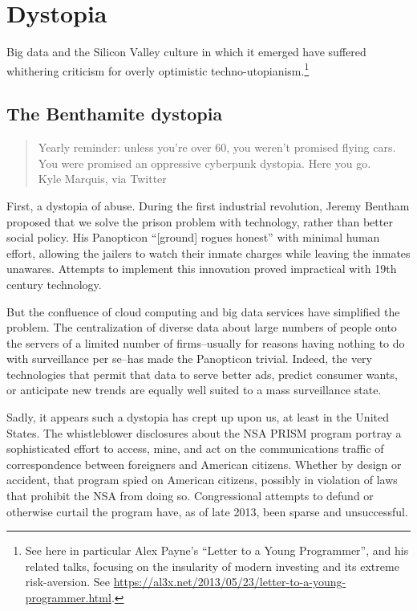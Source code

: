 \documentclass[12pt]{article}
\begin{document}
\section{Dystopia}
\label{sec:dystopic-future}

Big data and the Silicon Valley culture in which it emerged have
suffered whithering criticism for overly optimistic
techno-utopianism.\footnote{See here in particular Alex Payne's
  ``Letter to a Young Programmer'', and his related talks, focusing on
  the insularity of modern investing and its extreme
  risk-aversion. See
  \url{https://al3x.net/2013/05/23/letter-to-a-young-programmer.html}.}

\subsection{The Benthamite dystopia}
\label{sec:benthamite-dystopia}

\begin{quote}
  Yearly reminder: unless you're over 60, you weren't promised flying
  cars. You were promised an oppressive cyberpunk dystopia. Here you
  go.\\

  \vspace{12pt}
  Kyle Marquis, via Twitter
\end{quote}

First, a dystopia of abuse. During the first industrial revolution,
Jeremy Bentham proposed that we solve the prison problem with
technology, rather than better social policy. His Panopticon
``[ground] rogues honest'' with minimal human effort, allowing the
jailers to watch their inmate charges while leaving the inmates
unawares. Attempts to implement this innovation proved impractical
with 19th century technology.

But the confluence of cloud computing and big data services have
simplified the problem. The centralization of diverse data about large
numbers of people onto the servers of a limited number of
firms--usually for reasons having nothing to do with surveillance per
se--has made the Panopticon trivial. Indeed, the very technologies
that permit that data to serve better ads, predict consumer wants, or
anticipate new trends are equally well suited to a mass surveillance
state. 

Sadly, it appears such a dystopia has crept up upon us, at least in
the United States. The whistleblower disclosures about the NSA PRISM
program portray a sophisticated effort to access, mine, and act on the
communications traffic of correspondence between foreigners and
American citizens. Whether by design or accident, that program spied
on American citizens, possibly in violation of laws that prohibit the
NSA from doing so. Congressional attempts to defund or otherwise
curtail the program have, as of late 2013, been sparse and
unsuccessful.
\end{document}
